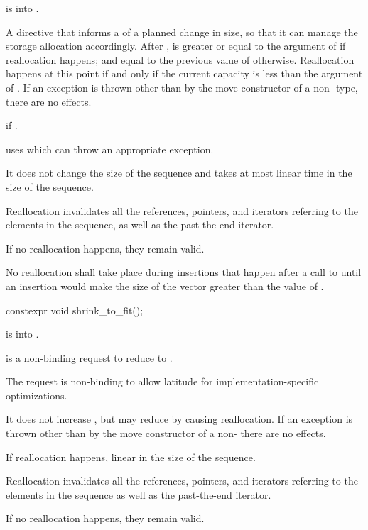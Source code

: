 \begin{itemdescr}
\pnum
\expects
{} is  into .

\pnum
\effects
A directive that informs a
of a planned change in size, so that it can manage the storage allocation accordingly.
After
,
is greater or equal to the argument of
if reallocation happens; and equal to the previous value of
otherwise.
Reallocation happens at this point if and only if the current capacity is less than the
argument of
. If an exception is thrown
other than by the move constructor of a non- type,
there are no effects.

\pnum
\throws
{} if .
\begin{footnote}
 uses  which
can throw an appropriate exception.
\end{footnote}

\pnum
\complexity
It does not change the size of the sequence and takes at most linear
time in the size of the sequence.

\pnum
\remarks
Reallocation invalidates all the references, pointers, and iterators
referring to the elements in the sequence, as well as the past-the-end iterator.
\begin{note}
If no reallocation happens, they remain valid.
\end{note}
No reallocation shall take place during insertions that happen
after a call to 
until an insertion would make the size of the vector
greater than the value of .
\end{itemdescr}

%
\begin{itemdecl}
constexpr void shrink_to_fit();
\end{itemdecl}

\begin{itemdescr}
\pnum
\expects
{} is  into .

\pnum
\effects
{} is a non-binding request to reduce
 to .
\begin{note}
The request is non-binding to allow latitude for
implementation-specific optimizations.
\end{note}
It does not increase , but may reduce 
by causing reallocation.
If an exception is thrown other than by the move constructor
of a non-  there are no effects.

\pnum
\complexity
If reallocation happens,
linear in the size of the sequence.

\pnum
\remarks
Reallocation invalidates all the references, pointers, and iterators
referring to the elements in the sequence as well as the past-the-end iterator.
\begin{note}
If no reallocation happens, they remain valid.
\end{note}
\end{itemdescr}


